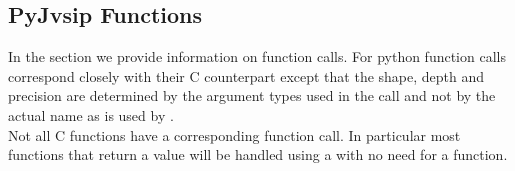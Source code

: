 \subsection*{PyJvsip Functions}
In the \pyjv{}  section we provide information on function calls. For \pyjv{} python function calls correspond closely with their C counterpart except that the shape, depth and precision are determined by the argument types used in the call and not by the actual name as is used by .\\[6pt]
Not all C functions have a corresponding \pyjv{} function call. In particular most functions that return a value will be handled using a  with no need for a function.
